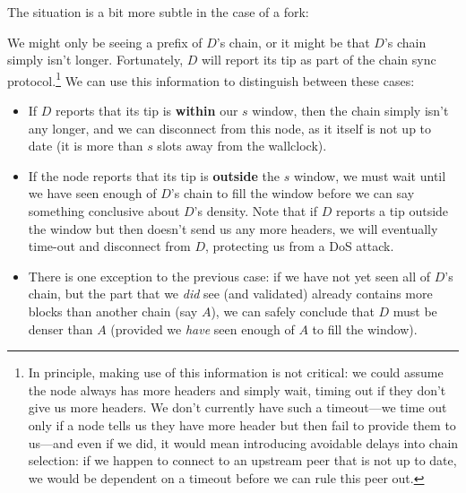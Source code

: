 The situation is a bit more subtle in the case of a fork:
%
\begin{center}
\end{center}
%
We might only be seeing a prefix of $D$'s chain, or it might be that $D$'s chain
simply isn't longer. Fortunately, $D$ will report its tip as part of the chain
sync protocol.\footnote{In principle, making use of this information is not
critical: we could assume the node always has more headers and simply wait,
timing out if they don't give us more headers. We don't currently have such a
timeout---we time out only if a node tells us they have more header but then
fail to provide them to us---and even if we did, it would mean introducing
avoidable delays into chain selection: if we happen to connect to an upstream
peer that is not up to date, we would be dependent on a timeout before we can
rule this peer out.} We can use this information to distinguish between these
cases:
%
\begin{itemize}
\item If $D$ reports that its tip is \textbf{within} our $s$ window, then the
chain simply isn't any longer, and we can disconnect from this node, as it
itself is not up to date (it is more than $s$ slots away from the wallclock).
\item If the node reports that its tip is \textbf{outside} the $s$ window, we
must wait until we have seen enough of $D$'s chain to fill the window before we
can say something conclusive about $D$'s density. Note that if $D$ reports a tip
outside the window but then doesn't send us any more headers, we will eventually
time-out and disconnect from $D$, protecting us from a DoS attack.
\item There is one exception to the previous case: if we have not yet seen all
of $D$'s chain, but the part that we \emph{did} see (and validated) already
contains more blocks than another chain (say $A$), we can safely conclude
that $D$ must be denser than $A$ (provided we \emph{have} seen enough of $A$
to fill the window).
\end{itemize}

